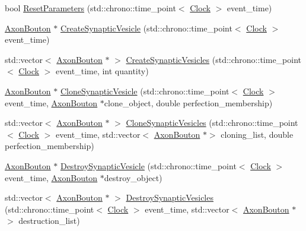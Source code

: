 \begin{DoxyCompactItemize}
\item 
bool \mbox{\hyperlink{class_axon_bouton_a73d3721361c4e1ce6b110ffe1b4a7a88}{Reset\+Parameters}} (std\+::chrono\+::time\+\_\+point$<$ \mbox{\hyperlink{universe_8h_a0ef8d951d1ca5ab3cfaf7ab4c7a6fd80}{Clock}} $>$ event\+\_\+time)
\item 
\mbox{\hyperlink{class_axon_bouton}{Axon\+Bouton}} $\ast$ \mbox{\hyperlink{class_axon_bouton_a2aa0abe381f6e7c87c702189d01dfbf2}{Create\+Synaptic\+Vesicle}} (std\+::chrono\+::time\+\_\+point$<$ \mbox{\hyperlink{universe_8h_a0ef8d951d1ca5ab3cfaf7ab4c7a6fd80}{Clock}} $>$ event\+\_\+time)
\item 
std\+::vector$<$ \mbox{\hyperlink{class_axon_bouton}{Axon\+Bouton}} $\ast$ $>$ \mbox{\hyperlink{class_axon_bouton_a0cabe429536722f14ae800c8579168b7}{Create\+Synaptic\+Vesicles}} (std\+::chrono\+::time\+\_\+point$<$ \mbox{\hyperlink{universe_8h_a0ef8d951d1ca5ab3cfaf7ab4c7a6fd80}{Clock}} $>$ event\+\_\+time, int quantity)
\item 
\mbox{\hyperlink{class_axon_bouton}{Axon\+Bouton}} $\ast$ \mbox{\hyperlink{class_axon_bouton_a0e739b20447539f8db3655e83575fcf4}{Clone\+Synaptic\+Vesicle}} (std\+::chrono\+::time\+\_\+point$<$ \mbox{\hyperlink{universe_8h_a0ef8d951d1ca5ab3cfaf7ab4c7a6fd80}{Clock}} $>$ event\+\_\+time, \mbox{\hyperlink{class_axon_bouton}{Axon\+Bouton}} $\ast$clone\+\_\+object, double perfection\+\_\+membership)
\item 
std\+::vector$<$ \mbox{\hyperlink{class_axon_bouton}{Axon\+Bouton}} $\ast$ $>$ \mbox{\hyperlink{class_axon_bouton_a7bf1d8db3287dc5357d0095233f5c47f}{Clone\+Synaptic\+Vesicles}} (std\+::chrono\+::time\+\_\+point$<$ \mbox{\hyperlink{universe_8h_a0ef8d951d1ca5ab3cfaf7ab4c7a6fd80}{Clock}} $>$ event\+\_\+time, std\+::vector$<$ \mbox{\hyperlink{class_axon_bouton}{Axon\+Bouton}} $\ast$$>$ cloning\+\_\+list, double perfection\+\_\+membership)
\item 
\mbox{\hyperlink{class_axon_bouton}{Axon\+Bouton}} $\ast$ \mbox{\hyperlink{class_axon_bouton_a75592b4ccc589db756183f4aaa694ffe}{Destroy\+Synaptic\+Vesicle}} (std\+::chrono\+::time\+\_\+point$<$ \mbox{\hyperlink{universe_8h_a0ef8d951d1ca5ab3cfaf7ab4c7a6fd80}{Clock}} $>$ event\+\_\+time, \mbox{\hyperlink{class_axon_bouton}{Axon\+Bouton}} $\ast$destroy\+\_\+object)
\item 
std\+::vector$<$ \mbox{\hyperlink{class_axon_bouton}{Axon\+Bouton}} $\ast$ $>$ \mbox{\hyperlink{class_axon_bouton_a0fa1c238a29d9e2b84b4d9c556452150}{Destroy\+Synaptic\+Vesicles}} (std\+::chrono\+::time\+\_\+point$<$ \mbox{\hyperlink{universe_8h_a0ef8d951d1ca5ab3cfaf7ab4c7a6fd80}{Clock}} $>$ event\+\_\+time, std\+::vector$<$ \mbox{\hyperlink{class_axon_bouton}{Axon\+Bouton}} $\ast$$>$ destruction\+\_\+list)

\end{DoxyCompactItemize}
